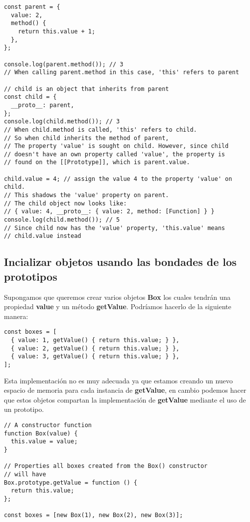 \documentclass{article}
\begin{document}
\begin{lstlisting}
const parent = {
  value: 2,
  method() {
    return this.value + 1;
  },
};

console.log(parent.method()); // 3
// When calling parent.method in this case, 'this' refers to parent

// child is an object that inherits from parent
const child = {
  __proto__: parent,
};
console.log(child.method()); // 3
// When child.method is called, 'this' refers to child.
// So when child inherits the method of parent,
// The property 'value' is sought on child. However, since child
// doesn't have an own property called 'value', the property is
// found on the [[Prototype]], which is parent.value.

child.value = 4; // assign the value 4 to the property 'value' on child.
// This shadows the 'value' property on parent.
// The child object now looks like:
// { value: 4, __proto__: { value: 2, method: [Function] } }
console.log(child.method()); // 5
// Since child now has the 'value' property, 'this.value' means
// child.value instead

\end{lstlisting}

\subsection*{Incializar objetos usando las bondades de los prototipos}

Supongamos que queremos crear varios objetos \textbf{Box} los cuales tendrán una propiedad \textbf{value} y un método
\textbf{getValue}. Podríamos hacerlo de la siguiente manera:

\begin{lstlisting}
const boxes = [
  { value: 1, getValue() { return this.value; } },
  { value: 2, getValue() { return this.value; } },
  { value: 3, getValue() { return this.value; } },
];
\end{lstlisting}

Esta implementación no es muy adecuada ya que estamos creando un nuevo espacio de memoria para cada instancia
de \textbf{getValue}, en cambio podemos hacer que estos objetos compartan la implementación de \textbf{getValue}
mediante el uso de un prototipo.

\begin{lstlisting}
// A constructor function
function Box(value) {
  this.value = value;
}

// Properties all boxes created from the Box() constructor
// will have
Box.prototype.getValue = function () {
  return this.value;
};

const boxes = [new Box(1), new Box(2), new Box(3)];
\end{lstlisting}
\end{document}
